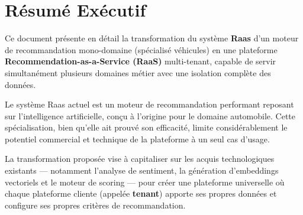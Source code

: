 \documentclass[11pt,a4paper]{report}
\newcommand{\concept}[1]{\textcolor{raasPrimary}{\textbf{#1}}}
\begin{document}


\chapter*{Résumé Exécutif}

\begin{infobox}
Ce document présente en détail la transformation du système \concept{Raas} d'un moteur de recommandation mono-domaine (spécialisé véhicules) en une plateforme \concept{Recommendation-as-a-Service (RaaS)} multi-tenant, capable de servir simultanément plusieurs domaines métier avec une isolation complète des données.
\end{infobox}

\vspace{0.5cm}

Le système Raas actuel est un moteur de recommandation performant reposant sur l'intelligence artificielle, conçu à l'origine pour le domaine automobile. Cette spécialisation, bien qu'elle ait prouvé son efficacité, limite considérablement le potentiel commercial et technique de la plateforme à un seul cas d'usage.

La transformation proposée vise à capitaliser sur les acquis technologiques existants --- notamment l'analyse de sentiment, la génération d'embeddings vectoriels et le moteur de scoring --- pour créer une plateforme universelle où chaque plateforme cliente (appelée \concept{tenant}) apporte ses propres données et configure ses propres critères de recommandation.
\end{document}
